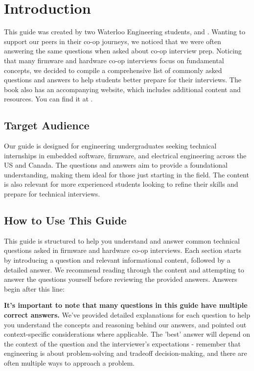 \documentclass[main.tex]{subfiles}
\begin{document}
\section{Introduction}

This guide was created by two Waterloo Engineering students,  and . Wanting to support our peers in their co-op journeys, we noticed that we were often answering the same questions when asked about co-op interview prep. Noticing that many firmware and hardware co-op interviews focus on fundamental concepts, we decided to compile a comprehensive list of commonly asked questions and answers to help students better prepare for their interviews. The book also has an accompanying website, which includes additional content and resources. You can find it at .

\subsection{Target Audience}
Our guide is designed for engineering undergraduates seeking technical internships in embedded software, firmware, and electrical engineering across the US and Canada. The questions and answers aim to provide a foundational understanding, making them ideal for those just starting in the field. The content is also relevant for more experienced students looking to refine their skills and prepare for technical interviews.

\subsection{How to Use This Guide}
This guide is structured to help you understand and answer common technical questions asked in firmware and hardware co-op interviews. Each section starts by introducing a question and relevant informational content, followed by a detailed answer. We recommend reading through the content and attempting to answer the questions yourself before reviewing the provided answers. Answers begin after this line: 

\spoilerlineraw

\noindent \textbf{It's important to note that many questions in this guide have multiple correct answers.} We've provided detailed explanations for each question to help you understand the concepts and reasoning behind our answers, and pointed out context-specific considerations where applicable. The 'best' answer will depend on the context of the question and the interviewer's expectations - remember that engineering is about problem-solving and tradeoff decision-making, and there are often multiple ways to approach a problem. 
\end{document}
